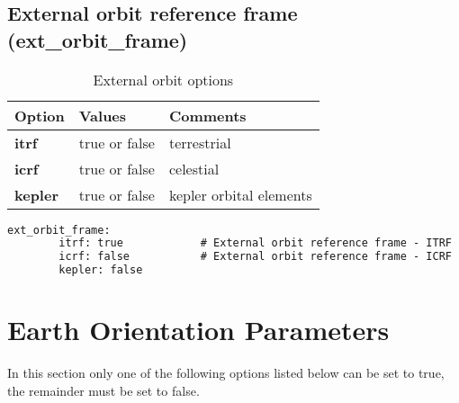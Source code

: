 \subsection{External orbit reference frame (ext\_orbit\_frame)}
\begin{table}[h!]
	\begin{tabular}{|p{4.5cm}|p{2cm}|p{3.5cm}|}
		\hline
		Option & Values & Comments \\
		\hline
		\textbf{itrf}  & true or false & terrestrial\\
		\textbf{icrf}  & true or false & celestial\\
		\textbf{kepler} & true or false & kepler orbital elements\\
        \hline
	\end{tabular}
	\caption{External orbit options}
	\label{table:yaml}
\end{table}
%
{\small
\begin{lstlisting}[language=xml,caption=external orbit reference frame yaml configuration example]
   ext_orbit_frame:
		itrf: true            # External orbit reference frame - ITRF
		icrf: false           # External orbit reference frame - ICRF
		kepler: false	
\end{lstlisting}
}
%        
\section{Earth Orientation Parameters}
In this section only one of the following options listed below can be set to true, the remainder must be set to false.\\
